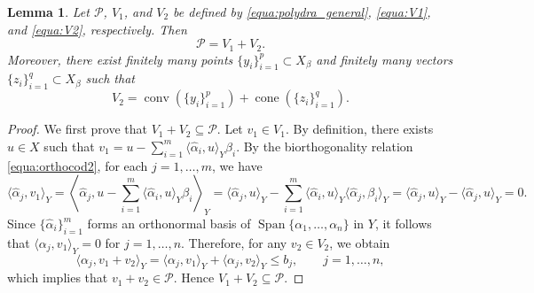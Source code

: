 \documentclass{article}
\numberwithin{equation}{section}
\newtheorem{lemma}{Lemma}[section]
\begin{document}
\begin{lemma}\label{lemma:decom_general}
Let $\mathcal{P}$, $V_1$, and $V_2$ be defined by \eqref{equa:polydra_general}, \eqref{equa:V1}, and \eqref{equa:V2}, respectively. Then
\[
\mathcal{P}=V_1+V_2.
\]
Moreover, there exist finitely many points $\{y_i\}_{i=1}^p\subset X_\beta$ and finitely many vectors $\{z_i\}_{i=1}^q\subset X_\beta$ such that
\begin{equation}\label{equa:decomll}
    V_2
    =
    \operatorname{conv}(\{y_i\}_{i=1}^p)
    +
    \operatorname{cone}(\{z_i\}_{i=1}^q).
\end{equation}
\end{lemma}

\begin{proof}
We first prove that $V_1+V_2\subseteq\mathcal{P}$. Let $v_1\in V_1$. By definition, there exists $u\in X$ such that $
v_1=u-\sum_{i=1}^m \langle \hat{\alpha}_i,u\rangle_Y \beta_i.$
By the biorthogonality relation \eqref{equa:orthocod2}, for each $j=1,\dots,m$, we have
\begin{equation*}
    \langle \hat{\alpha}_j,v_1\rangle_Y=
\left\langle
\hat{\alpha}_j,
u-\sum_{i=1}^m \langle \hat{\alpha}_i,u\rangle_Y \beta_i
\right\rangle_Y=
\langle \hat{\alpha}_j,u\rangle_Y
-
\sum_{i=1}^m \langle \hat{\alpha}_i,u\rangle_Y \langle \hat{\alpha}_j,\beta_i\rangle_Y =
\langle \hat{\alpha}_j,u\rangle_Y-\langle \hat{\alpha}_j,u\rangle_Y
=0.
\end{equation*}
Since $\{\hat{\alpha}_i\}_{i=1}^m$ forms an orthonormal basis of $\operatorname{Span}\{\alpha_1,\dots,\alpha_n\}$ in $Y$, it follows that
$\langle \alpha_j,v_1\rangle_Y=0$ for $j=1,\dots,n$. Therefore, for any $v_2\in V_2$, we obtain
\begin{equation}
\langle \alpha_j,v_1+v_2\rangle_Y
=
\langle \alpha_j,v_1\rangle_Y+\langle \alpha_j,v_2\rangle_Y
\le b_j,
\qquad j=1,\dots,n,    
\end{equation}
which implies that $v_1+v_2\in\mathcal{P}$. Hence $V_1+V_2\subseteq\mathcal{P}$.


\end{proof}
\end{document}
